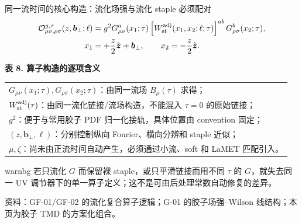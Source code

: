 \documentclass[UTF8,aspectratio=169,11pt]{ctexbeamer}
\newcommand{\source}[1]{%
  \par\vspace{-0.08em}%
  \noindent\parbox[t]{0.97\linewidth}{\raggedright\scriptsize\color{muted}资料：#1}\par}
\newcommand{\ad}{\mathrm{adj}}
\begin{document}
\begin{frame}[t]{同一流时间的核心构造：流化场强与流化 staple 必须配对}
  \begin{align*}
    \mathcal O_{\mu\nu,\rho\sigma}^{g,\tau}(z,\boldsymbol b_\perp;\ell)
    &=g^2G^a_{\mu\nu}(x_1;\tau)
    \left[W_{\rm st}^{\ad}(x_1,x_2;\ell;\tau)\right]^{ab}
    G^b_{\rho\sigma}(x_2;\tau),\\
    x_1&=+\frac z2\hat{\boldsymbol z}+\boldsymbol b_\perp,
    \qquad x_2=-\frac z2\hat{\boldsymbol z}.
  \end{align*}
  \begin{center}
  \textbf{表 8. 算子构造的逐项含义}
  \vspace{0.12em}
  {\scriptsize\begin{tabular}{@{}p{\linewidth}@{}}
    \toprule
    $G_{\mu\nu}(x_1;\tau),G_{\rho\sigma}(x_2;\tau)$：由同一流场 $B_\mu(\tau)$ 求得；\\
    $W_{\rm st}^{\ad}(\tau)$：由同一流化链接/流场构造，不能混入 $\tau=0$ 的原始链接；\\
    $g^2$：便于与常用胶子 PDF 归一化接轨，具体位置由 convention 固定；\\
    $(z,\boldsymbol b_\perp,\ell)$：分别控制纵向 Fourier、横向分辨和 staple 近似；\\
    $\mu,\zeta$：尚未由正流时间自动产生，必须通过小流、soft 和 LaMET 匹配引入。\\
    \bottomrule
  \end{tabular}}
  \end{center}
  \begin{beamercolorbox}[wd=0.96\textwidth,sep=0.45em,rounded=true]{warnbg}
    若只流化 $G$ 而保留裸 staple，或只平滑链接而用不同 $\tau$ 的 $G$，就失去同一 UV 调节器下的单一算子定义；这不是可由后处理常数自动修复的差异。
  \end{beamercolorbox}
  \source{GF-01/GF-02 的流化复合算子逻辑；G-01 的胶子场强--Wilson 线结构；本页为胶子 TMD 的方案化组合。}
\end{frame}
\end{document}

